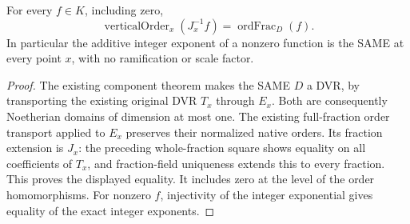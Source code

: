 \begin{lemma}
\label{lem:gauss-leading-original-vertical-order}
\leanok
For every $f\in K$, including zero,
\[
 \operatorname{verticalOrder}_x(J_x^{-1}f)
   =\operatorname{ordFrac}_{D}(f).
\]
In particular the additive integer exponent of a nonzero function is the
SAME at every point $x$, with no ramification or scale factor.
\end{lemma}
\begin{proof}
The existing component theorem makes the SAME $D$ a DVR, by transporting
the existing original DVR $T_x$ through $E_x$. Both are consequently
Noetherian domains of dimension at most one. The existing full-fraction
order transport applied to $E_x$ preserves their normalized native orders.
Its fraction extension is $J_x$: the preceding whole-fraction square
shows equality on all coefficients of $T_x$, and fraction-field uniqueness
extends this to every fraction. This proves the displayed equality.
It includes zero at the level of the order homomorphisms. For nonzero
$f$, injectivity of the integer exponential gives equality of the exact
integer exponents.
\end{proof}

